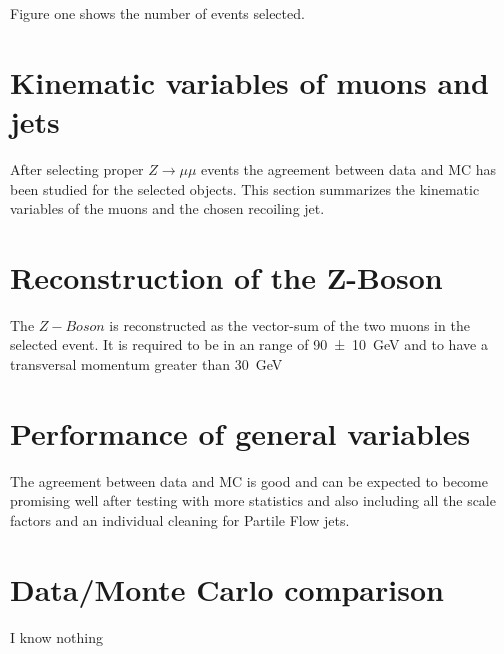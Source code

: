 Figure one shows the number of events selected. 

\section{Kinematic variables of muons and jets}

After selecting proper $Z \rightarrow \mu \mu$ events the agreement between data and MC has been studied for the selected objects. This section summarizes the kinematic variables of the muons and the chosen recoiling jet.

\section{Reconstruction of the Z-Boson}

The $Z-Boson$ is reconstructed as the vector-sum of the two muons in the selected event.
It is required to be in an range of \SI{90+-10}{\GeV} and to have a transversal momentum greater than \SI{30}{\GeV}


\section{Performance of general variables}


The agreement between data and MC is good and can be expected to become promising well after testing with more statistics and also including all the scale factors and an individual cleaning for Partile Flow jets.


\section{Data/Monte Carlo comparison}
\label{results}

I know nothing